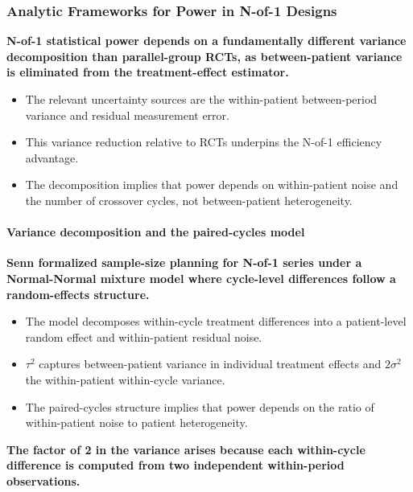 \documentclass[
  11pt,
]{article}
\begin{document}
\subsubsection{Analytic Frameworks for Power in N-of-1 Designs}\label{analytic-frameworks-for-power-in-n-of-1-designs}

\textbf{N-of-1 statistical power depends on a fundamentally different variance decomposition than parallel-group RCTs, as between-patient variance is eliminated from the treatment-effect estimator.}

\begin{itemize}\setlength{\itemsep}{2pt}\setlength{\parskip}{0pt}
\item The relevant uncertainty sources are the within-patient between-period variance and residual measurement error.
\item This variance reduction relative to RCTs underpins the N-of-1 efficiency advantage.
\item The decomposition implies that power depends on within-patient noise and the number of crossover cycles, not between-patient heterogeneity.
\end{itemize}

\paragraph{Variance decomposition and the paired-cycles model}\label{variance-decomposition-and-the-paired-cycles-model}

\textbf{Senn formalized sample-size planning for N-of-1 series under a Normal-Normal mixture model where cycle-level differences follow a random-effects structure.}

\begin{itemize}\setlength{\itemsep}{2pt}\setlength{\parskip}{0pt}
\item The model decomposes within-cycle treatment differences into a patient-level random effect and within-patient residual noise.
\item $\tau^2$ captures between-patient variance in individual treatment effects and $2\sigma^2$ the within-patient within-cycle variance.
\item The paired-cycles structure implies that power depends on the ratio of within-patient noise to patient heterogeneity.
\end{itemize}

\textbf{The factor of 2 in the variance arises because each within-cycle difference is computed from two independent within-period observations.}
\end{document}
